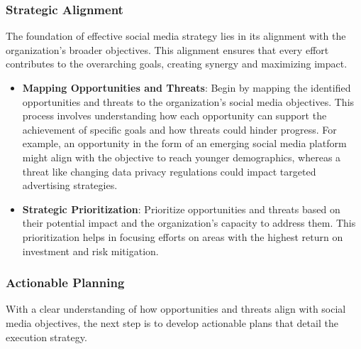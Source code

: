\documentclass[
]{book}
\providecommand{\tightlist}{%
  \setlength{\itemsep}{0pt}\setlength{\parskip}{0pt}}
\begin{document}
\hypertarget{strategic-alignment}{%
\subsubsection*{Strategic Alignment}\label{strategic-alignment}}

The foundation of effective social media strategy lies in its alignment with the organization's broader objectives. This alignment ensures that every effort contributes to the overarching goals, creating synergy and maximizing impact.

\begin{itemize}
\tightlist
\item
  \textbf{Mapping Opportunities and Threats}: Begin by mapping the identified opportunities and threats to the organization's social media objectives. This process involves understanding how each opportunity can support the achievement of specific goals and how threats could hinder progress. For example, an opportunity in the form of an emerging social media platform might align with the objective to reach younger demographics, whereas a threat like changing data privacy regulations could impact targeted advertising strategies.
\item
  \textbf{Strategic Prioritization}: Prioritize opportunities and threats based on their potential impact and the organization's capacity to address them. This prioritization helps in focusing efforts on areas with the highest return on investment and risk mitigation.
\end{itemize}

\hypertarget{actionable-planning}{%
\subsubsection*{Actionable Planning}\label{actionable-planning}}

With a clear understanding of how opportunities and threats align with social media objectives, the next step is to develop actionable plans that detail the execution strategy.
\end{document}
